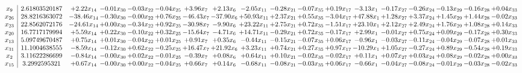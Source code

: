 \documentclass[9pt]{article}
\begin{document}
 \[\begin{array}{c| c c@{\hskip 2pt} c@{\hskip 2pt} c@{\hskip 2pt} c@{\hskip 2pt} c@{\hskip 2pt} c@{\hskip 2pt} c@{\hskip 2pt} c@{\hskip 2pt} c@{\hskip 2pt} c@{\hskip 2pt} c@{\hskip 2pt} c@{\hskip 2pt} c@{\hskip 2pt} c@{\hskip 2pt} c@{\hskip 2pt} c@{\hskip 2pt} }
 x_{9}   &  2.61803520187 & +  2.22 x_{14} & -0.01 x_{30} & -0.03 x_{22} & -0.04 x_{25} & +  3.96 x_{7} & +  2.13 x_{6} & -2.05 x_{11} & -0.28 x_{21} & -0.07 x_{35} & +  0.19 x_{17} & -3.13 x_{1} & -0.17 x_{27} & -0.26 x_{24} & -0.13 x_{29} & -0.16 x_{28} & +  0.04 x_{33}\\
 x_{26}   &  28.8216363072 & -38.46 x_{14} & -0.30 x_{30} & -0.00 x_{22} & +  0.76 x_{25} & -46.43 x_{7} & -37.90 x_{6} & + 50.93 x_{11} & +  2.37 x_{21} & +  0.55 x_{35} & -3.04 x_{17} & + 47.88 x_{1} & +  1.28 x_{27} & +  3.37 x_{24} & +  1.45 x_{29} & +  1.44 x_{28} & -0.02 x_{33}\\
 x_{23}   &  22.8562072176 & -24.61 x_{14} & +  0.00 x_{30} & -0.34 x_{22} & +  0.92 x_{25} & -30.98 x_{7} & -9.90 x_{6} & + 23.22 x_{11} & +  2.75 x_{21} & +  0.72 x_{35} & -1.51 x_{17} & + 23.10 x_{1} & +  2.12 x_{27} & +  2.49 x_{24} & +  1.76 x_{29} & +  1.08 x_{28} & +  0.14 x_{33}\\
 x_{20}   &  16.7717179994 & +  5.59 x_{14} & +  0.22 x_{30} & -0.10 x_{22} & +  0.32 x_{25} & -15.64 x_{7} & -4.71 x_{6} & + 14.71 x_{11} & -0.29 x_{21} & +  0.72 x_{35} & -0.17 x_{17} & +  2.99 x_{1} & -0.01 x_{27} & +  0.75 x_{24} & +  0.09 x_{29} & -0.17 x_{28} & +  0.30 x_{33}\\
 x_{13}   &  5.09749670487 & +  0.75 x_{14} & +  0.01 x_{30} & -0.04 x_{22} & +  0.01 x_{25} & +  0.91 x_{7} & +  0.35 x_{6} & -0.44 x_{11} & -0.15 x_{21} & -0.07 x_{35} & +  0.06 x_{17} & -0.96 x_{1} & -0.03 x_{27} & -0.11 x_{24} & -0.04 x_{29} & -0.07 x_{28} & +  0.01 x_{33}\\
 x_{31}   &  11.1004638555 & -8.59 x_{14} & -0.12 x_{30} & +  0.62 x_{22} & -0.25 x_{25} & + 16.47 x_{7} & + 21.92 x_{6} & +  3.23 x_{11} & +  0.74 x_{21} & +  0.27 x_{35} & +  0.97 x_{17} & -10.29 x_{1} & +  1.05 x_{27} & -0.27 x_{24} & +  0.89 x_{29} & -0.54 x_{28} & +  0.19 x_{33}\\
 x_{2}   &  3.11622286699 & -0.84 x_{14} & -0.00 x_{30} & +  0.02 x_{22} & -0.01 x_{25} & -0.39 x_{7} & +  0.08 x_{6} & +  0.64 x_{11} & +  0.10 x_{21} & -0.02 x_{35} & -0.02 x_{17} & +  0.11 x_{1} & +  0.07 x_{27} & +  0.03 x_{24} & +  0.08 x_{29} & -0.02 x_{28} & +  0.00 x_{33}\\
 x_{15}   &  3.2992595321 & +  0.67 x_{14} & -0.00 x_{30} & +  0.00 x_{22} & -0.04 x_{25} & +  0.66 x_{7} & +  0.14 x_{6} & -0.68 x_{11} & -0.08 x_{21} & -0.03 x_{35} & +  0.06 x_{17} & -0.66 x_{1} & -0.04 x_{27} & -0.08 x_{24} & -0.01 x_{29} & -0.03 x_{28} & -0.02 x_{33}\\

\end{array}\]
\end{document}
